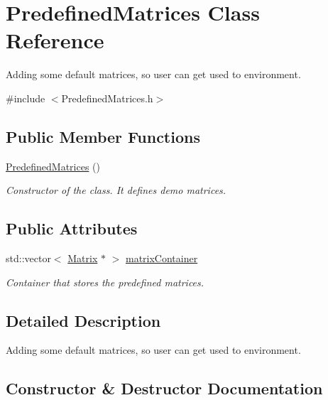 \hypertarget{class_predefined_matrices}{}\section{Predefined\+Matrices Class Reference}
\label{class_predefined_matrices}


Adding some default matrices, so user can get used to environment.  




{\ttfamily \#include $<$Predefined\+Matrices.\+h$>$}

\subsection*{Public Member Functions}
\begin{DoxyCompactItemize}
\item 
\hyperlink{class_predefined_matrices_a9b01f9627bb7589f61d68c8aa3e807d5}{Predefined\+Matrices} ()
\begin{DoxyCompactList}\small\item\em Constructor of the class. It defines demo matrices. \end{DoxyCompactList}\end{DoxyCompactItemize}
\subsection*{Public Attributes}
\begin{DoxyCompactItemize}
\item 
std\+::vector$<$ \hyperlink{class_matrix}{Matrix} $\ast$ $>$ \hyperlink{class_predefined_matrices_a2db167eb7f3e7d15bd8201e122f581c4}{matrix\+Container}
\begin{DoxyCompactList}\small\item\em Container that stores the predefined matrices. \end{DoxyCompactList}\end{DoxyCompactItemize}


\subsection{Detailed Description}
Adding some default matrices, so user can get used to environment. 

\subsection{Constructor \& Destructor Documentation}
\mbox{\label{class_predefined_matrices_a9b01f9627bb7589f61d68c8aa3e807d5}} 
